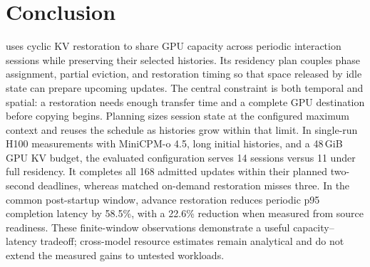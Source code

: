 \section{Conclusion}
\label{sec:conclusion}

\systemname uses cyclic KV restoration to share GPU capacity across periodic interaction sessions while preserving their selected histories.
Its residency plan couples phase assignment, partial eviction, and restoration timing so that space released by idle state can prepare upcoming updates.
The central constraint is both temporal and spatial: a restoration needs enough transfer time and a complete GPU destination before copying begins.
Planning sizes session state at the configured maximum context and reuses the schedule as histories grow within that limit.
In single-run H100 measurements with MiniCPM-o 4.5, long initial histories, and a 48\,GiB GPU KV budget, the evaluated configuration serves 14 sessions versus 11 under full residency.
It completes all 168 admitted updates within their planned two-second deadlines, whereas matched on-demand restoration misses three.
In the common post-startup window, advance restoration reduces periodic p95 completion latency by 58.5\%, with a 22.6\% reduction when measured from source readiness.
These finite-window observations demonstrate a useful capacity--latency tradeoff; cross-model resource estimates remain analytical and do not extend the measured gains to untested workloads.
